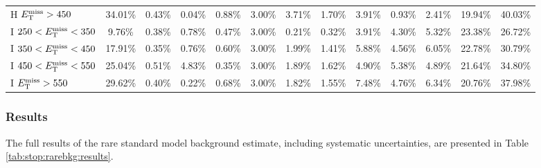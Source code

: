 \begin{table}
\begin{tabular}{|l|ccccccccccc|c|}
 H $E_\text{T}^\text{miss}>450$     & 34.01\% & 0.43\%  & 0.04\%  & 0.88\%  & 3.00\%  & 3.71\%  & 1.70\%  & 3.91\%  & 0.93\%  & 2.41\%  & 19.94\% & 40.03\% \\
 I $250<E_\text{T}^\text{miss}<350$ & 9.76\%  & 0.38\%  & 0.78\%  & 0.47\%  & 3.00\%  & 0.21\%  & 0.32\%  & 3.91\%  & 4.30\%  & 5.32\%  & 23.38\% & 26.72\% \\
 I $350<E_\text{T}^\text{miss}<450$ & 17.91\% & 0.35\%  & 0.76\%  & 0.60\%  & 3.00\%  & 1.99\%  & 1.41\%  & 5.88\%  & 4.56\%  & 6.05\%  & 22.78\% & 30.79\% \\
 I $450<E_\text{T}^\text{miss}<550$ & 25.04\% & 0.51\%  & 4.83\%  & 0.35\%  & 3.00\%  & 1.89\%  & 1.62\%  & 4.90\%  & 5.38\%  & 4.89\%  & 21.64\% & 34.80\% \\
 I $E_\text{T}^\text{miss}>550$     & 29.62\% & 0.40\%  & 0.22\%  & 0.68\%  & 3.00\%  & 1.82\%  & 1.55\%  & 7.48\%  & 4.76\%  & 6.34\%  & 20.76\% & 37.98\% \\
\hline
\end{tabular}
\end{table}

\subsubsection{Results}
\label{sssec:stop:rarebkg:results}

The full results of the rare standard model background estimate,
including systematic uncertainties, are presented in Table
\ref{tab:stop:rarebkg:results}.

